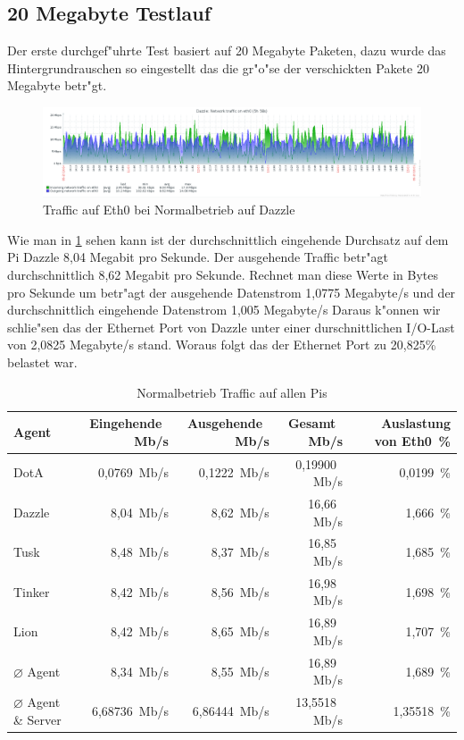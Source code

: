 \subsection{20 Megabyte Testlauf}
\label{subsec:20mbTestlauf}
Der erste durchgef"uhrte Test basiert auf 20 Megabyte Paketen, dazu wurde das Hintergrundrauschen %
so eingestellt das die gr"o"se der verschickten Pakete 20 Megabyte betr"gt. 

\begin{figure}[htbp]
\centering
\includegraphics*[width=0.9\linewidth]{Abb/ZabbixDazzle/Standard/DazzleStandard}

\caption{Traffic auf Eth0 bei Normalbetrieb auf Dazzle}
\label{fig:Eth0DazzleStandard}
\end{figure}

Wie man in \cref{fig:Eth0DazzleStandard} sehen kann ist der durchschnittlich eingehende Durchsatz auf dem Pi Dazzle 8,04 Megabit %
pro Sekunde. Der ausgehende Traffic betr"agt durchschnittlich 8,62 Megabit pro Sekunde. Rechnet man diese Werte in Bytes pro Sekunde um %
betr"agt der ausgehende Datenstrom 1,0775 Megabyte/s und der durchschnittlich eingehende Datenstrom 1,005 Megabyte/s %
Daraus k"onnen wir schlie"sen das der Ethernet Port von Dazzle unter einer durschnittlichen I/O-Last von 2,0825 Megabyte/s stand. %
Woraus folgt das der Ethernet Port zu 20,825\% belastet war.
\begin{table}
\centering
\begin{tabular}{l%
 r<{\,Mb/s}%
 r<{\,Mb/s}%
 r<{\,Mb/s}%
 r<{\,\%}%
}
Agent  				& Eingehende		& Ausgehende		& Gesamt		& Auslastung von Eth0	\\
\hline
DotA				& 0,0769		& 0,1222		& 0,19900		& 0,0199 		\\
Dazzle 				& 8,04 			& 8,62			& 16,66 		& 1,666			\\
Tusk 				& 8,48			& 8,37			& 16,85			& 1,685			\\
Tinker				& 8,42			& 8,56			& 16,98			& 1,698			\\
Lion				& 8,42			& 8,65			& 16,89			& 1,707			\\ 
$\diameter $ Agent 		& 8,34			& 8,55 			& 16,89			& 1,689 		\\   
$\diameter $ Agent \& Server 	& 6,68736		& 6,86444		& 13,5518		& 1,35518		\\

\end{tabular}
\caption{Normalbetrieb Traffic auf allen Pis}
\label{tab:standardTraffic}
\end{table}

